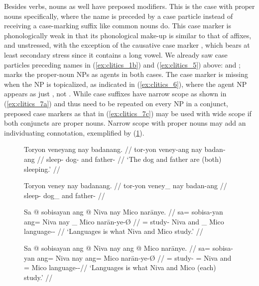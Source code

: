 \label{clitics_prenoun_case}
Besides verbs, nouns as well have preposed modifiers. This is the
case with proper nouns specifically, where the name is preceded by a case
particle instead of receiving a case-marking suffix like common nouns do. This
case marker is phonologically weak in that its phonological make-up is similar
to that of affixes, and unstressed, with the exception of the causative case
marker , which bears at least secondary stress since it contains
a long vowel. We already saw case particles preceding names in
(\ref{ex:clitics_1b}) and (\ref{ex:clitics_5}) above:  and ;  marks the proper-noun NPs
as agents in both cases. The case marker is missing when the NP is topicalized,
as indicated in (\ref{ex:clitics_6}), where the agent NP appears as just
, not . While case suffixes have narrow
scope as shown in (\ref{ex:clitics_7a}) and thus need to be repeated on every
NP in a conjunct, preposed case markers as that in (\ref{ex:clitics_7c}) may be
used with wide scope if both conjuncts are proper nouns. Narrow scope with
proper nouns may add an individuating connotation, exemplified by
(\ref{ex:clitics_7d}).

\begin{figure}
\pex\label{ex:clitics_7}
\a\label{ex:clitics_7a}\begingl
	\gla Toryon veneyang nay badanang. //
	\glb tor-yon veney-ang nay badan-ang //
	\glc sleep-\TplN{} dog-\Aarg{} and father-\Aarg{} //
	\glft `The dog and father are (both) sleeping.' //
\endgl

\a\label{ex:clitics_7b}\ljudge{*}\begingl
	\gla Toryon veney nay badanang. //
	\glb tor-yon veney\_ nay badan-ang //
	\glc sleep-\TplN{} dog\_ and father-\Aarg{} //
\endgl

\a\label{ex:clitics_7c}\begingl
	\gla Sa @ sobisayan ang @ Niva nay {} Mico narānye. //
	\glb sa= sobisa-yan ang= Niva nay \_ Mico narān-ye-Ø //
	\glc \PatT{}= study-\TplM{} \Aarg{} Niva and \_ Mico 
		language-\Pl{}-\Top{} //
	\glft `Languages is what Niva and Mico study.' //
\endgl

\a\label{ex:clitics_7d}\begingl
	\gla Sa @ sobisayan ang @ Niva nay ang @ Mico narānye. //
	\glb sa= sobisa-yan ang= Niva nay ang= Mico narān-ye-Ø //
	\glc \PatT{}= study-\TplM{} \Aarg{}= Niva and \Aarg{}= Mico 
		language-\Pl{}-\Top{}//
	\glft `Languages is what Niva and Mico (each) study.' //
\endgl
\xe
\end{figure}

